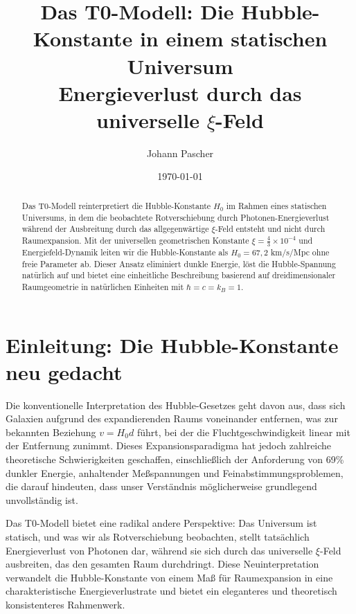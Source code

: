 \documentclass[12pt,a4paper]{article}
\begin{document}
	
	\title{Das T0-Modell: Die Hubble-Konstante in einem statischen Universum \\
		Energieverlust durch das universelle $\xi$-Feld}
	\author{Johann Pascher}
	\date{\today}
	
	\maketitle
	
	\begin{abstract}
		Das T0-Modell reinterpretiert die Hubble-Konstante $H_0$ im Rahmen eines statischen Universums, in dem die beobachtete Rotverschiebung durch Photonen-Energieverlust während der Ausbreitung durch das allgegenwärtige $\xi$-Feld entsteht und nicht durch Raumexpansion. Mit der universellen geometrischen Konstante $\xi = \frac{4}{3} \times 10^{-4}$ und Energiefeld-Dynamik leiten wir die Hubble-Konstante als $H_0 = 67{,}2$ km/s/Mpc ohne freie Parameter ab. Dieser Ansatz eliminiert dunkle Energie, löst die Hubble-Spannung natürlich auf und bietet eine einheitliche Beschreibung basierend auf dreidimensionaler Raumgeometrie in natürlichen Einheiten mit $\hbar = c = k_B = 1$.
	\end{abstract}
	
	\tableofcontents
	\newpage
	
	\section{Einleitung: Die Hubble-Konstante neu gedacht}
	
	Die konventionelle Interpretation des Hubble-Gesetzes geht davon aus, dass sich Galaxien aufgrund des expandierenden Raums voneinander entfernen, was zur bekannten Beziehung $v = H_0 d$ führt, bei der die Fluchtgeschwindigkeit linear mit der Entfernung zunimmt. Dieses Expansionsparadigma hat jedoch zahlreiche theoretische Schwierigkeiten geschaffen, einschließlich der Anforderung von 69\% dunkler Energie, anhaltender Meßspannungen und Feinabstimmungsproblemen, die darauf hindeuten, dass unser Verständnis möglicherweise grundlegend unvollständig ist.
	
	Das T0-Modell bietet eine radikal andere Perspektive: Das Universum ist statisch, und was wir als Rotverschiebung beobachten, stellt tatsächlich Energieverlust von Photonen dar, während sie sich durch das universelle $\xi$-Feld ausbreiten, das den gesamten Raum durchdringt. Diese Neuinterpretation verwandelt die Hubble-Konstante von einem Maß für Raumexpansion in eine charakteristische Energieverlustrate und bietet ein eleganteres und theoretisch konsistenteres Rahmenwerk.
	
\end{document}
